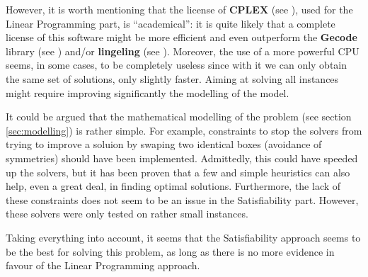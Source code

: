 \hfill

However, it is worth mentioning that the license of \textbf{CPLEX} (see \cite{CplexWEB}),
used for the Linear Programming part, is ``academical'': it is quite likely that a complete
license of this software might be more efficient and even outperform the \textbf{Gecode}
library (see \cite{GecodeWEB}) and/or \textbf{lingeling} (see \cite{lingeling}). Moreover,
the use of a more powerful CPU seems, in some cases, to be completely useless since with it
we can only obtain the same set of solutions, only slightly faster. Aiming at solving all
instances might require improving significantly the modelling of the model.

\hfill

It could be argued that the mathematical modelling of the problem (see section
\ref{sec:modelling}) is rather simple. For example, constraints to stop the solvers from
trying to improve a soluion by swaping two identical boxes (avoidance of symmetries) should
have been implemented. Admittedly, this could have speeded up the solvers, but it has been
proven that a few and simple heuristics can also help, even a great deal, in finding optimal
solutions. Furthermore, the lack of these constraints does not seem to be an issue in the
Satisfiability part. However, these solvers were only tested on rather small instances.

\hfill

Taking everything into account, it seems that the Satisfiability approach seems to be the
best for solving this problem, as long as there is no more evidence in favour of the
Linear Programming approach.




